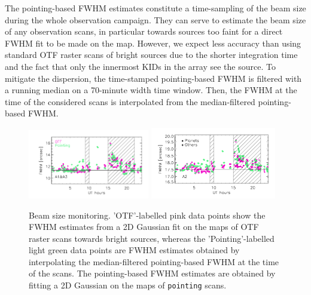 The pointing-based FWHM estimates constitute a time-sampling of the
beam size during the whole observation campaign. They can serve to
estimate the beam size of any observation scans, in particular
towards sources too faint for a direct FWHM %
fit to be made on the map. However, we
expect less accuracy than using standard OTF raster
scans of bright sources due to the shorter integration time and the
fact that only the innermost KIDs in the array see the source.
To mitigate the dispersion, the time-stamped
pointing-based FWHM
is filtered with a running median on a 70-minute
width time window. Then, the FWHM %
at the time of the considered scans is
interpolated from the median-filtered pointing-based FWHM.%
%
\begin{figure}[ht!]
  \begin{center}
    \includegraphics[clip=true, trim={0.9cm, 0.5cm, 0.5cm, 0.5cm}, width=0.4725\textwidth]{Figures/Beam_monitoring_with_otfs_vs_ut_compare_pointings_1mm.pdf}
    \includegraphics[clip=true, trim={0.5cm, 0.5cm, 0.5cm, 0.5cm}, width=0.4875\textwidth]{Figures/Beam_monitoring_with_otfs_vs_ut_compare_pointings_a2.pdf}
    \caption[Beam size monitoring comparison]{Beam size monitoring.
     'OTF'-labelled pink data points show the FWHM estimates from a 2D
    Gaussian fit on the maps of OTF raster scans towards bright
    sources, whereas the 'Pointing'-labelled light green data points
    are FWHM estimates obtained by interpolating the {\lp
    median-filtered} pointing-based FWHM at the time of the
    scans. {\lp The
    pointing-based FWHM estimates are obtained by fitting a 2D Gaussian on the
    maps of {\tt pointing} scans.}}
\label{fig:beam_monitoring_compare}
\end{center}
\end{figure}
